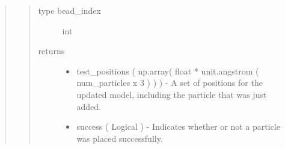 \documentclass[letterpaper,12pt,english,openany,oneside]{sphinxmanual}
\begin{document}
\begin{fulllineitems}
\begin{quote}
\begin{quote}
\begin{description}
\item[{type bead\_index}] \leavevmode
int

\item[{returns}] \leavevmode\begin{itemize}
\item {} 
test\_positions ( np.array( float * unit.angstrom ( num\_particles x 3 ) ) ) - A set of positions for the updated model, including the particle that was just added.

\item {} 
success ( Logical ) - Indicates whether or not a particle was placed successfully.

\end{itemize}

\end{description}\end{quote}
\end{quote}

\end{fulllineitems}

\end{document}
